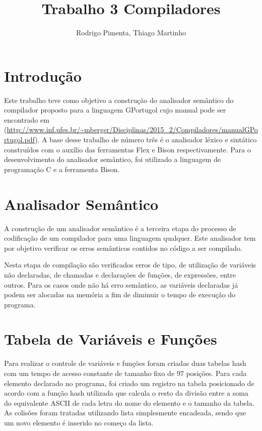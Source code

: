 \documentclass[
12pt,				%
a4paper,			%
english,			%
french,				%
spanish,			%
brazil,				%
article
]{abntex2}
\title{Trabalho 3 Compiladores}
\author{Rodrigo Pimenta, Thiago Martinho}
\begin{document}
\maketitle

\section{Introdução}

Este trabalho teve como objetivo a construção do analisador semântico do  compilador proposto para a linguagem GPortugol cujo manual pode ser encontrado em (\url{http://www.inf.ufes.br/~mberger/Disciplinas/2015_2/Compiladores/manualGPortugol.pdf}). A base desse trabalho de número três é o analisador léxico e sintático construídos com o auxílio das ferramentas Flex e Bison respectivamente.
Para o desenvolvimento do analisador semântico, foi utilizado a linguagem de programação C e a ferramenta Bison.


\section{Analisador Semântico}

A construção de um analisador semântico é a terceira etapa do processo de codificação de um compilador para uma linguagem qualquer. Este analisador tem por objetivo verificar os erros semânticos contidos no código a ser compilado. 

Nesta etapa de compilação são verificados erros de tipo, de utilização de variáveis não declaradas, de chamadas e declarações de funções, de expressões, entre outros. Para os casos onde não há erro semântico, as variáveis declaradas já podem ser alocadas na memória a fim de diminuir o tempo de execução do programa.  

\section{Tabela de Variáveis e Funções}

Para realizar o controle de variáveis e funções foram criadas duas tabelas hash com um tempo de acesso constante de tamanho fixo de 97 posições. Para cada elemento declarado no programa, foi criado um registro na tabela posicionado de acordo com a função hash utilizada que calcula o resto da divisão entre a soma do equivalente ASCII de cada letra do nome do elemento e o tamanho da tabela. As colisões foram tratadas utilizando lista simplesmente encadeada, sendo que um novo elemento é inserido no começo da lista.
\end{document}
